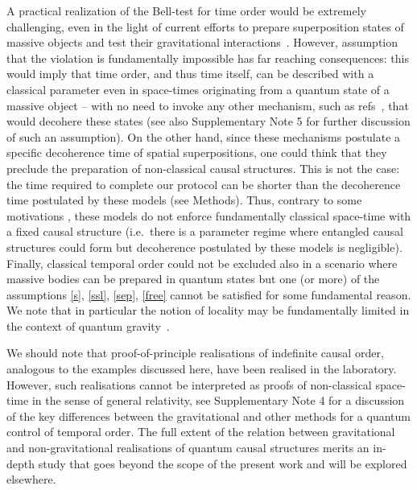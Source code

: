 \documentclass[a4paper,11pt]{article}
\begin{document}
A practical realization of the Bell-test for time order would be extremely challenging, even in the light of current efforts to prepare superposition states of massive objects and test their gravitational interactions~\cite{Bose:1999:PRA, marshall2003towards, ref:Kleckner2009, KimBoseUlbricht:2016PRL, Schmoele:2016}. However, assumption that the violation is {fundamentally} impossible has far reaching consequences: this {would imply} that time order, and thus time itself, {can} be described with a classical parameter even in space-times originating from a quantum state of a massive object -- with no need to invoke any other mechanism, such as refs~\cite{ref:Karolyhazy1966, ref:Diosi1989, ref:Penrose1996, Stamp:2012, Penrose2014},   that would decohere these states (see also Supplementary Note 5 for further discussion of such an assumption). On the other hand, since these mechanisms postulate a specific decoherence time of spatial superpositions, one could think that they preclude the preparation of non-classical causal structures. This is not the case: the time required to complete our protocol can be shorter than the decoherence time postulated by these models (see Methods). Thus, contrary to some motivations \cite{ref:Penrose1996, Penrose2014}, these models do not enforce {fundamentally} classical space-time with a fixed causal structure {(i.e.~there is a parameter regime where entangled causal structures could form but decoherence postulated by these models is negligible).}
Finally, classical temporal order could not be excluded %
also in a scenario where massive bodies can be prepared in quantum states but one (or more) of the assumptions \ref{s}, \ref{ssl}, \ref{sep}, \ref{free} cannot be satisfied for some fundamental reason. We note that in particular the notion of locality may be fundamentally limited in the context of quantum gravity~\cite{PhysRevD.74.064018, PhysRevD.93.024030}.

We should note that proof-of-principle realisations of indefinite causal order, analogous to the examples discussed here, have been realised in the laboratory. However, such realisations cannot be interpreted as proofs of non-classical space-time in the sense of general relativity, see Supplementary Note 4 for a discussion of the key differences between the gravitational and other methods for a quantum control of temporal order. The full extent of the relation between gravitational and non-gravitational realisations of quantum causal structures merits an in-depth study that goes beyond the scope of the present work and will be explored elsewhere.
\end{document}
